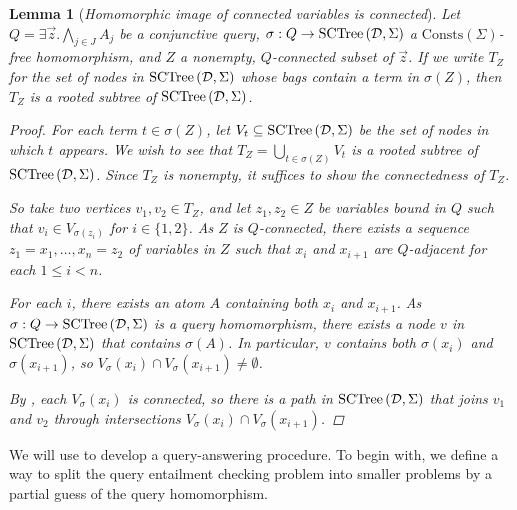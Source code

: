 \documentclass[12pt]{report}
\theoremstyle{plain}
\newtheorem{lemma}[theorem]{Lemma}
\theoremstyle{definition}
\def\Consts{{\mathrm{Consts}}}
\newcommand{\SCTree}[2]{\ensuremath{\normalfont{\textrm{SCTree}} \left( #1, #2 \right)}}
\begin{document}
\begin{lemma}[\emph{Homomorphic image of connected variables is connected}]
\label{image-of-connected-variables-is-connected}
  Let $Q = \exists \vec{z}. \bigwedge_{j \in J} A_j$ be a conjunctive query, $\sigma: Q \rightarrow \SCTree{\mathcal{D}}{\Sigma}$ a $\Consts(\Sigma)$-free homomorphism, and $Z$ a nonempty, $Q$-connected subset of $\vec{z}$. If we write $T_Z$ for the set of nodes in $\SCTree{\mathcal{D}}{\Sigma}$ whose bags contain a term in $\sigma(Z)$, then $T_Z$ is a rooted subtree of $\SCTree{\mathcal{D}}{\Sigma}$.
  \begin{proof}
    For each term $t \in \sigma(Z)$, let $V_t \subseteq \SCTree{\mathcal{D}}{\Sigma}$ be the set of nodes in which $t$ appears. We wish to see that $T_Z = \bigcup_{t \in \sigma(Z)} V_t$ is a rooted subtree of $\SCTree{\mathcal{D}}{\Sigma}$. Since $T_Z$ is nonempty, it suffices to show the connectedness of $T_Z$.

    So take two vertices $v_1, v_2 \in T_Z$, and let $z_1, z_2 \in Z$ be variables bound in $Q$ such that $v_i \in V_{\sigma(z_i)}$ for $i \in \{1, 2\}$. As $Z$ is $Q$-connected, there exists a sequence $z_1 = x_1, \ldots, x_n = z_2$ of variables in $Z$ such that $x_i$ and $x_{i+1}$ are $Q$-adjacent for each $1 \leq i < n$.

    For each $i$, there exists an atom $A$ containing both $x_i$ and $x_{i+1}$. As \newline $\sigma: Q \rightarrow \SCTree{\mathcal{D}}{\Sigma}$ is a query homomorphism, there exists a node $v$ in $\SCTree{\mathcal{D}}{\Sigma}$ that contains $\sigma(A)$. In particular, $v$ contains both $\sigma(x_i)$ and $\sigma(x_{i+1})$, so $V_\sigma(x_i) \cap V_\sigma(x_{i+1}) \neq \emptyset$.

    By , each $V_\sigma(x_i)$ is connected, so there is a path in $\SCTree{\mathcal{D}}{\Sigma}$ that joins $v_1$ and $v_2$ through intersections $V_\sigma(x_i) \cap V_\sigma(x_{i+1})$.
  \end{proof}
\end{lemma}

We will use  to develop a query-answering procedure. To begin with, we define a way to split the query entailment checking problem into smaller problems by a partial guess of the query homomorphism.
\end{document}
